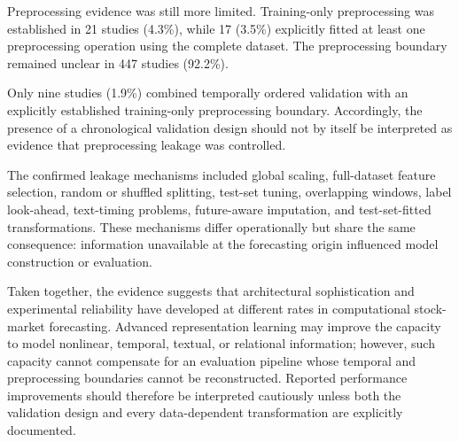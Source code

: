 \documentclass[pdflatex,sn-mathphys-num]{sn-jnl}%
\theoremstyle{thmstyleone}%
\theoremstyle{thmstyletwo}%
\theoremstyle{thmstylethree}%
\begin{document}
\FloatBarrier

Preprocessing evidence was still more limited. Training-only
preprocessing was established in 21 studies (4.3\%), while 17 (3.5\%)
explicitly fitted at least one preprocessing operation using the complete
dataset. The preprocessing boundary remained unclear in 447 studies
(92.2\%).

Only nine studies (1.9\%) combined temporally ordered validation with
an explicitly established training-only preprocessing boundary.
Accordingly, the presence of a chronological validation design should
not by itself be interpreted as evidence that preprocessing leakage was
controlled.


The confirmed leakage mechanisms included global scaling,
full-dataset feature selection, random or shuffled splitting,
test-set tuning, overlapping windows, label look-ahead,
text-timing problems, future-aware imputation, and
test-set-fitted transformations. These mechanisms differ
operationally but share the same consequence: information unavailable
at the forecasting origin influenced model construction or evaluation.

Taken together, the evidence suggests that architectural sophistication
and experimental reliability have developed at different rates in
computational stock-market forecasting. Advanced representation
learning may improve the capacity to model nonlinear, temporal, textual,
or relational information; however, such capacity cannot compensate for
an evaluation pipeline whose temporal and preprocessing boundaries
cannot be reconstructed. Reported performance improvements should
therefore be interpreted cautiously unless both the validation design
and every data-dependent transformation are explicitly documented.


\end{document}
